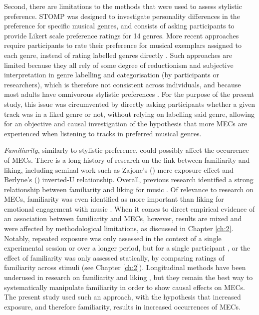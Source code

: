 Second, there are limitations to the methods that were used to assess stylistic preference. STOMP was designed to investigate personality differences in the preference for specific musical genres, and consists of asking participants to provide Likert scale preference ratings for 14 genres. More recent approaches require participants to rate their preference for musical exemplars assigned to each genre, instead of rating labelled genres directly \parencite{bonnevilleroussy2017,rentfrow2011}. Such approaches are limited because they all rely of some degree of reductionism and subjective interpretation in genre labelling and categorisation (by participants or researchers), which is therefore not consistent across individuals, and because most adults have omnivorous stylistic preferences \parencite[for a review, see][]{greasley2016}. For the purpose of the present study, this issue was circumvented by directly asking participants whether a given track was in a liked genre or not, without relying on labelling said genre, allowing for an objective and causal investigation of the hypothesis that more MECs are experienced when listening to tracks in preferred musical genres.

\emph{Familiarity}, similarly to stylistic preference, could possibly affect the occurrence of MECs. There is a long history of research on the link between familiarity and liking, including seminal work such as Zajonc's (\citeyear{zajonc1968}) mere exposure effect and Berlyne's (\citeyear{berlyne1971}) inverted-U relationship. Overall, previous research identified a strong relationship between familiarity and liking for music \parencite[for a review, see][]{greasley2016}. Of relevance to research on MECs, familiarity was even identified as more important than liking for emotional engagement with music \parencite{pereira2011}. When it comes to direct empirical evidence of an association between familiarity and MECs, however, results are mixed and were affected by methodological limitations, as discussed in Chapter \ref{ch:2}. Notably, repeated exposure was only assessed in the context of a single experimental session \parencite{baltes2011,bannister2020b,blood2001} or over a longer period, but for a single participant \parencite{grewe2007}, or the effect of familiarity was only assessed statically, by comparing ratings of familiarity across stimuli (see Chapter \ref{ch:2}). Longitudinal methods have been underused in research on familiarity and liking \parencite{greasley2016}, but they remain the best way to systematically manipulate familiarity in order to show causal effects on MECs. The present study used such an approach, with the hypothesis that increased exposure, and therefore familiarity, results in increased occurrences of MECs.

